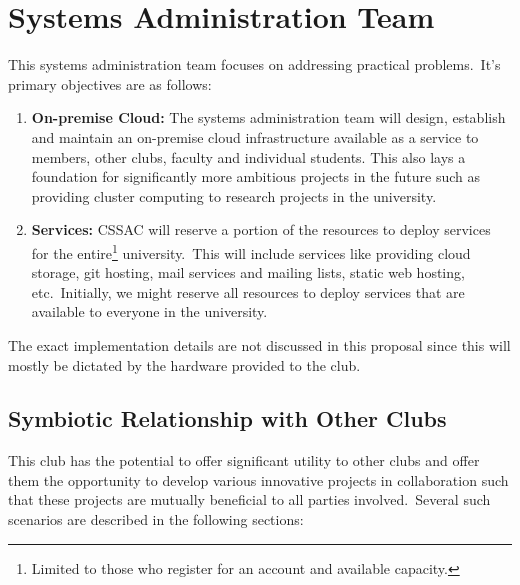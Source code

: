\documentclass[11pt,twocolumn,oneside]{book}
\begin{document}
    \section{\large Systems Administration Team}\label{sec:systems-administration-team}
    This systems administration team focuses on addressing practical problems.\ It's primary objectives are as follows:
    \begin{enumerate}
        \item \textbf{On-premise Cloud:} The systems administration team will design, establish and maintain an
        on-premise cloud infrastructure available as a service to members, other clubs, faculty and individual students.
        This also lays a foundation for significantly more ambitious projects in the future such as providing cluster
        computing to research projects in the university.
        \item \textbf{Services:} CSSAC will reserve a portion of the resources to deploy services for the
        entire\footnote{Limited to those who register for an account and available capacity.} university.\ This will
        include services like providing cloud storage, git hosting, mail services and mailing lists, static web hosting,
        etc.\ Initially, we might reserve all resources to deploy services that are available to everyone in the
        university.
    \end{enumerate}
    The exact implementation details are not discussed in this proposal since this will mostly be dictated by the
    hardware provided to the club.

    \subsection{Symbiotic Relationship with Other Clubs}\label{subsec:symbiotic-relationship-with-other-clubs}
    This club has the potential to offer significant utility to other clubs and offer them the opportunity to develop
    various innovative projects in collaboration such that these projects are mutually beneficial to all parties
    involved.\ Several such scenarios are described in the following sections:
\end{document}
